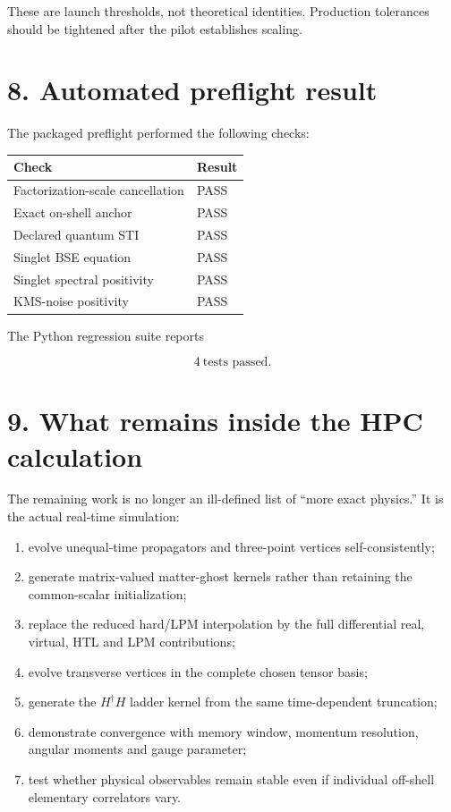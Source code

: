 \documentclass[
  10pt,
]{article}
\providecommand{\tightlist}{%
  \setlength{\itemsep}{0pt}\setlength{\parskip}{0pt}}
\begin{document}
These are launch thresholds, not theoretical identities. Production
tolerances should be tightened after the pilot establishes scaling.

\section{8. Automated preflight
result}\label{automated-preflight-result}

The packaged preflight performed the following checks:

\begin{longtable}[]{@{}ll@{}}
\toprule\noalign{}
Check & Result \\
\midrule\noalign{}
\endhead
\bottomrule\noalign{}
\endlastfoot
Factorization-scale cancellation & PASS \\
Exact on-shell anchor & PASS \\
Declared quantum STI & PASS \\
Singlet BSE equation & PASS \\
Singlet spectral positivity & PASS \\
KMS-noise positivity & PASS \\
\end{longtable}

The Python regression suite reports

\[
\boxed{4\ \text{tests passed}.}
\]

\section{9. What remains inside the HPC
calculation}\label{what-remains-inside-the-hpc-calculation}

The remaining work is no longer an ill-defined list of ``more exact
physics.'' It is the actual real-time simulation:

\begin{enumerate}
\def\labelenumi{\arabic{enumi}.}
\tightlist
\item
  evolve unequal-time propagators and three-point vertices
  self-consistently;
\item
  generate matrix-valued matter-ghost kernels rather than retaining the
  common-scalar initialization;
\item
  replace the reduced hard/LPM interpolation by the full differential
  real, virtual, HTL and LPM contributions;
\item
  evolve transverse vertices in the complete chosen tensor basis;
\item
  generate the \(H^\dagger H\) ladder kernel from the same
  time-dependent truncation;
\item
  demonstrate convergence with memory window, momentum resolution,
  angular moments and gauge parameter;
\item
  test whether physical observables remain stable even if individual
  off-shell elementary correlators vary.
\end{enumerate}
\end{document}
